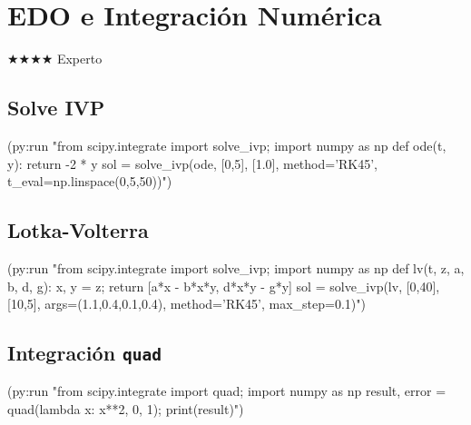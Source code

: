 \chapter{EDO e Integración Numérica}
\label{chap:ode-integration}
{\huge$\bigstar$}{\huge$\bigstar$}{\huge$\bigstar$}{\huge$\bigstar$} Experto

\section{Solve IVP}
\begin{lispcode}
(py:run "from scipy.integrate import solve_ivp; import numpy as np
def ode(t, y): return -2 * y
sol = solve_ivp(ode, [0,5], [1.0], method='RK45', t_eval=np.linspace(0,5,50))")
\end{lispcode}

\section{Lotka-Volterra}
\begin{lispcode}
(py:run "from scipy.integrate import solve_ivp; import numpy as np
def lv(t, z, a, b, d, g):
    x, y = z; return [a*x - b*x*y, d*x*y - g*y]
sol = solve_ivp(lv, [0,40], [10,5], args=(1.1,0.4,0.1,0.4),
                method='RK45', max_step=0.1)")
\end{lispcode}

\section{Integración \texttt{quad}}
\begin{lispcode}
(py:run "from scipy.integrate import quad; import numpy as np
result, error = quad(lambda x: x**2, 0, 1); print(result)")
\end{lispcode}

